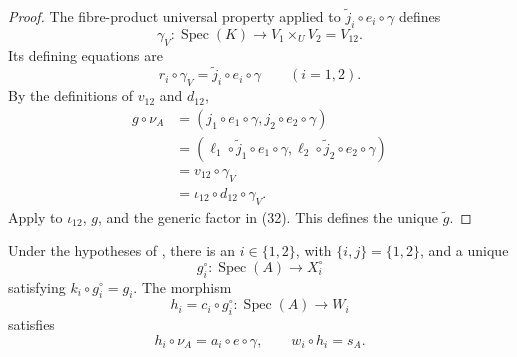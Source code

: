 \begin{proof}
  The fibre-product universal property applied to
  $\widetilde j_i\circ e_i\circ\gamma$ defines
  \[
    \gamma_V\colon\operatorname{Spec}(K)\to V_1\times_UV_2=V_{12}.
  \]
  Its defining equations are
  \[
    r_i\circ\gamma_V=\widetilde j_i\circ e_i\circ\gamma
      \qquad(i=1,2).                                             \tag{31c}
  \]
  By the definitions of $v_{12}$ and $d_{12}$,
  \[
  \begin{aligned}
    g\circ\nu_A
      &=(j_1\circ e_1\circ\gamma,j_2\circ e_2\circ\gamma)\\
      &=(\ell_1\circ\widetilde j_1\circ e_1\circ\gamma,
          \ell_2\circ\widetilde j_2\circ e_2\circ\gamma)\\
      &=v_{12}\circ\gamma_V\\
      &=\iota_{12}\circ d_{12}\circ\gamma_V.
  \end{aligned}                                                    \tag{32}
  \]
  Apply  to
  $\iota_{12}$, $g$, and the generic factor in (32).  This defines the unique
  $\widetilde g$.
\end{proof}

\begin{lemma}
  \label{lemma:nagata-one-valuation-avoids-boundary}
  \lean{}

  Under the hypotheses of
  , there is an
  $i\in\{1,2\}$, with $\{i,j\}=\{1,2\}$, and a unique
  \[
    g_i^\circ\colon\operatorname{Spec}(A)\to X_i^\circ
  \]
  satisfying $k_i\circ g_i^\circ=g_i$.  The morphism
  \[
    h_i=c_i\circ g_i^\circ\colon\operatorname{Spec}(A)\to W_i
  \]
  satisfies
  \[
    h_i\circ\nu_A=a_i\circ e\circ\gamma,\qquad
    w_i\circ h_i=s_A.
  \]
\end{lemma}

